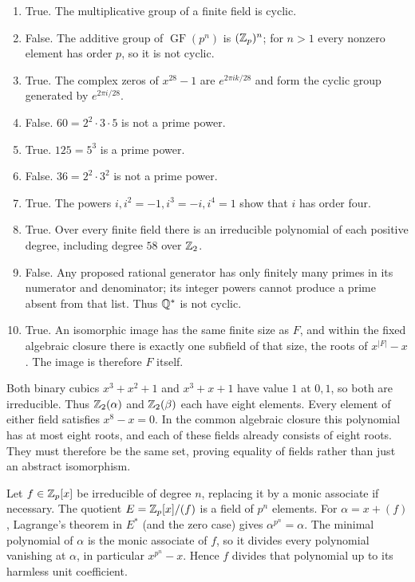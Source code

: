 \begin{enumerate}[label=(\alph*)]
\item True. The multiplicative group of a finite field is cyclic.
\item False. The additive group of $\operatorname{GF}(p^n)$ is $(\mathbb{Z}_p)^n$; for $n>1$ every nonzero element has order $p$, so it is not cyclic.
\item True. The complex zeros of $x^{28}-1$ are $e^{2\pi i k/28}$ and form the cyclic group generated by $e^{2\pi i/28}$.
\item False. $60=2^2\cdot3\cdot5$ is not a prime power.
\item True. $125=5^3$ is a prime power.
\item False. $36=2^2\cdot3^2$ is not a prime power.
\item True. The powers $i,i^2=-1,i^3=-i,i^4=1$ show that $i$ has order four.
\item True. Over every finite field there is an irreducible polynomial of each positive degree, including degree $58$ over $\mathbb{Z}_2$.
\item False. Any proposed rational generator has only finitely many primes in its numerator and denominator; its integer powers cannot produce a prime absent from that list. Thus $\mathbb{Q}^*$ is not cyclic.
\item True. An isomorphic image has the same finite size as $F$, and within the fixed algebraic closure there is exactly one subfield of that size, the roots of $x^{|F|}-x$. The image is therefore $F$ itself.
\end{enumerate}

Both binary cubics $x^3+x^2+1$ and $x^3+x+1$ have value $1$ at $0,1$, so both are irreducible. Thus $\mathbb{Z}_2(\alpha)$ and $\mathbb{Z}_2(\beta)$ each have eight elements. Every element of either field satisfies $x^8-x=0$. In the common algebraic closure this polynomial has at most eight roots, and each of these fields already consists of eight roots. They must therefore be the same set, proving equality of fields rather than just an abstract isomorphism.

Let $f\in\mathbb{Z}_p[x]$ be irreducible of degree $n$, replacing it by a monic associate if necessary. The quotient $E=\mathbb{Z}_p[x]/(f)$ is a field of $p^n$ elements. For $\alpha=x+(f)$, Lagrange's theorem in $E^*$ (and the zero case) gives $\alpha^{p^n}=\alpha$. The minimal polynomial of $\alpha$ is the monic associate of $f$, so it divides every polynomial vanishing at $\alpha$, in particular $x^{p^n}-x$. Hence $f$ divides that polynomial up to its harmless unit coefficient.

